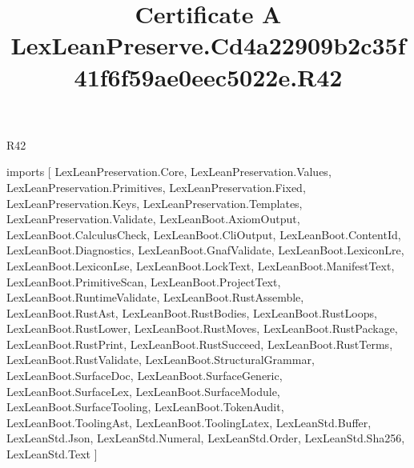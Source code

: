 \begin{lexlean}{R42}
\title{Certificate A LexLeanPreserve.Cd4a22909b2c35f41f6f59ae0eec5022e.R42}
\begin{coremodule}
imports [
  LexLeanPreservation.Core,
  LexLeanPreservation.Values,
  LexLeanPreservation.Primitives,
  LexLeanPreservation.Fixed,
  LexLeanPreservation.Keys,
  LexLeanPreservation.Templates,
  LexLeanPreservation.Validate,
  LexLeanBoot.AxiomOutput,
  LexLeanBoot.CalculusCheck,
  LexLeanBoot.CliOutput,
  LexLeanBoot.ContentId,
  LexLeanBoot.Diagnostics,
  LexLeanBoot.GnafValidate,
  LexLeanBoot.LexiconLre,
  LexLeanBoot.LexiconLse,
  LexLeanBoot.LockText,
  LexLeanBoot.ManifestText,
  LexLeanBoot.PrimitiveScan,
  LexLeanBoot.ProjectText,
  LexLeanBoot.RuntimeValidate,
  LexLeanBoot.RustAssemble,
  LexLeanBoot.RustAst,
  LexLeanBoot.RustBodies,
  LexLeanBoot.RustLoops,
  LexLeanBoot.RustLower,
  LexLeanBoot.RustMoves,
  LexLeanBoot.RustPackage,
  LexLeanBoot.RustPrint,
  LexLeanBoot.RustSucceed,
  LexLeanBoot.RustTerms,
  LexLeanBoot.RustValidate,
  LexLeanBoot.StructuralGrammar,
  LexLeanBoot.SurfaceDoc,
  LexLeanBoot.SurfaceGeneric,
  LexLeanBoot.SurfaceLex,
  LexLeanBoot.SurfaceModule,
  LexLeanBoot.SurfaceTooling,
  LexLeanBoot.TokenAudit,
  LexLeanBoot.ToolingAst,
  LexLeanBoot.ToolingLatex,
  LexLeanStd.Buffer,
  LexLeanStd.Json,
  LexLeanStd.Numeral,
  LexLeanStd.Order,
  LexLeanStd.Sha256,
  LexLeanStd.Text
]


\end{coremodule}
\end{lexlean}

